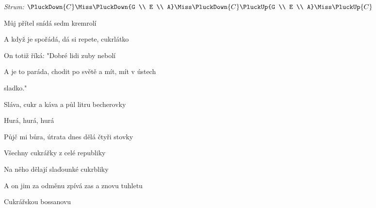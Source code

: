 \begin{song}


\begin{strumbox}
\textit{Strum:} $\PluckDown{C}\Miss\PluckDown{G \\ E \\ A}\Miss\PluckDown{C}\PluckUp{G \\ E \\ A}\Miss\PluckUp{C}$
\end{strumbox}

\begin{hchordbox}
\end{hchordbox}

\large

\bigskip

Můj přítel  snídá sedm kremrolí  \par
A když je spořádá, dá si repete,  cukrlátko  \par
On totiž říká:  "Dobré lidi zuby nebolí  \par
A je to paráda, chodit po světě a mít, mít v ústech \par
{}sladko."    \par

\bigskip

\begin{chorusboxwide}{\Refren}
Sláva,  cukr a káva a půl litru becherovky \par
{}Hurá, hurá, hurá \par
Půjč mi bůra, útrata dnes dělá čtyři stovky \par
Všechny cukrářky z celé  republiky \par
Na něho dělají slaďounké cukrbliky \par
A on jim za odměnu zpívá zas a znovu tuhletu  \par
Cukrářskou bossanovu    \par
\end{chorusboxwide}

\bigskip


\end{song}
